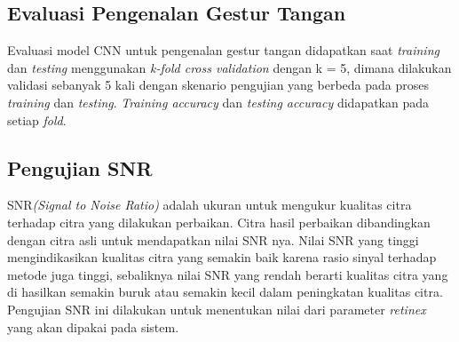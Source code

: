 \subsection{Evaluasi Pengenalan Gestur Tangan}
Evaluasi model CNN untuk pengenalan gestur tangan didapatkan saat \emph{training} dan \emph{testing} menggunakan \emph{k-fold cross validation} dengan k = 5, dimana dilakukan validasi sebanyak 5 kali dengan skenario pengujian yang berbeda pada proses \emph{training} dan \emph{testing}.
\emph{Training accuracy} dan \emph{testing accuracy} didapatkan pada setiap \emph{fold}.
\subsection{Pengujian SNR}
SNR\emph{(Signal to Noise Ratio)} adalah ukuran untuk mengukur kualitas citra terhadap citra yang dilakukan perbaikan. Citra hasil perbaikan dibandingkan dengan citra asli untuk mendapatkan nilai SNR nya. Nilai SNR yang tinggi mengindikasikan kualitas citra yang semakin baik karena rasio sinyal terhadap metode juga tinggi, sebaliknya nilai SNR yang rendah berarti kualitas citra yang di hasilkan semakin buruk atau semakin kecil dalam peningkatan kualitas citra. Pengujian SNR ini dilakukan untuk menentukan nilai dari parameter \emph{retinex} yang akan dipakai pada sistem.
